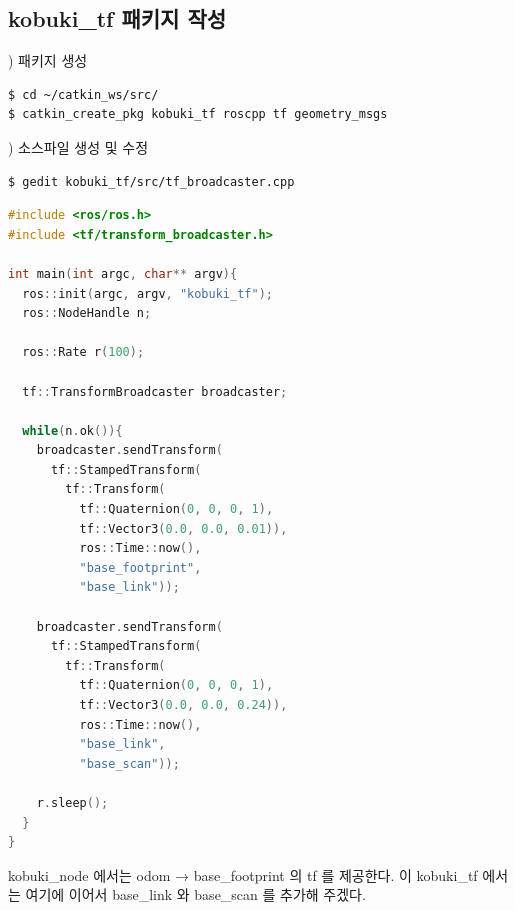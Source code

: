 \subsection{kobuki\_tf 패키지 작성}

\setcounter{num}{0}

\vspace{\baselineskip}
\noindent
{}
\thenum) 패키지 생성

\vspace{\baselineskip}
\begin{lstlisting}[language=ROS]
$ cd ~/catkin_ws/src/
$ catkin_create_pkg kobuki_tf roscpp tf geometry_msgs
\end{lstlisting}


\vspace{\baselineskip}
\noindent
{}
\thenum) 소스파일 생성 및 수정

\vspace{\baselineskip}
\begin{lstlisting}[language=ROS]
$ gedit kobuki_tf/src/tf_broadcaster.cpp 
\end{lstlisting}


\vspace{\baselineskip}
\begin{lstlisting}[language=C++]
#include <ros/ros.h>
#include <tf/transform_broadcaster.h>

int main(int argc, char** argv){
  ros::init(argc, argv, "kobuki_tf");
  ros::NodeHandle n;

  ros::Rate r(100);

  tf::TransformBroadcaster broadcaster;

  while(n.ok()){
    broadcaster.sendTransform(
      tf::StampedTransform(
        tf::Transform(
          tf::Quaternion(0, 0, 0, 1),
          tf::Vector3(0.0, 0.0, 0.01)),
          ros::Time::now(),
          "base_footprint",
          "base_link"));

    broadcaster.sendTransform(
      tf::StampedTransform(
        tf::Transform(
          tf::Quaternion(0, 0, 0, 1),
          tf::Vector3(0.0, 0.0, 0.24)),
          ros::Time::now(),
          "base_link",
          "base_scan"));

    r.sleep();
  }
}
\end{lstlisting}


kobuki\_node 에서는 odom → base\_footprint 의 tf 를 제공한다. 이 kobuki\_tf 에서는 여기에 이어서 base\_link 와 base\_scan 를 추가해 주겠다.\\

